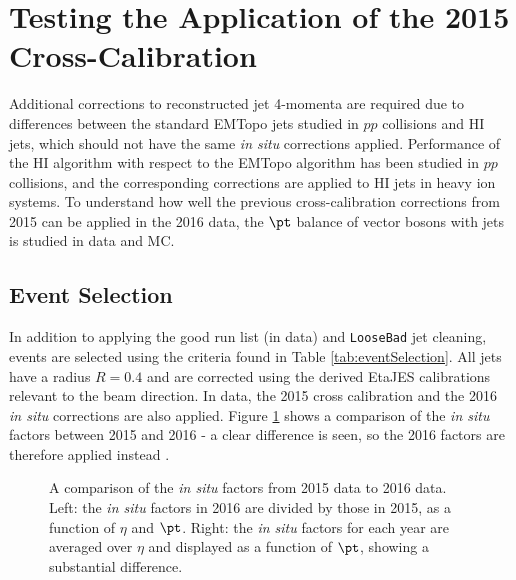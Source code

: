 \documentclass[NOTE, atlasdraft=true, texlive=2016, USenglish]{\ATLASLATEXPATH atlasdoc}
\begin{document}
\section{Testing the Application of the 2015 Cross-Calibration}
\label{sec:EtaJES}

Additional corrections to reconstructed jet 4-momenta are required due to differences between the standard EMTopo jets studied in $pp$ collisions and HI jets, which should not have the same \textit{in situ} corrections applied. Performance of the HI algorithm with respect to the EMTopo algorithm has been studied in $pp$ collisions, and the corresponding corrections are applied to HI jets in heavy ion systems. To understand how well the previous cross-calibration corrections from 2015 \cite{ATL-COM-PHYS-2016-1253} can be applied in the 2016 data, the $\pt$ balance of vector bosons with jets is studied in data and MC.\par
\subsection{Event Selection}
In addition to applying the good run list (in data) and \texttt{LooseBad} jet cleaning, events are selected using the criteria found in Table \ref{tab:eventSelection}. All jets have a radius $R=0.4$ and are corrected using the derived EtaJES calibrations relevant to the beam direction. In data, the 2015 cross calibration and the 2016 \textit{in situ} corrections are also applied. Figure \ref{fig:insituComp} shows a comparison of the \textit{in situ} factors between 2015 and 2016 - a clear difference is seen, so the 2016 factors are therefore applied instead \cite{ATLAS-CONF-2015-017}.
\begin{figure}[htbp]
	\centering
	\caption{A comparison of the \textit{in situ} factors from 2015 data to 2016 data. Left: the \textit{in situ} factors in 2016 are divided by those in 2015, as a function of $\eta$ and $\pt$. Right: the \textit{in situ} factors for each year are averaged over $\eta$ and displayed as a function of $\pt$, showing a substantial difference.}
	\label{fig:insituComp}
\end{figure}
\end{document}
